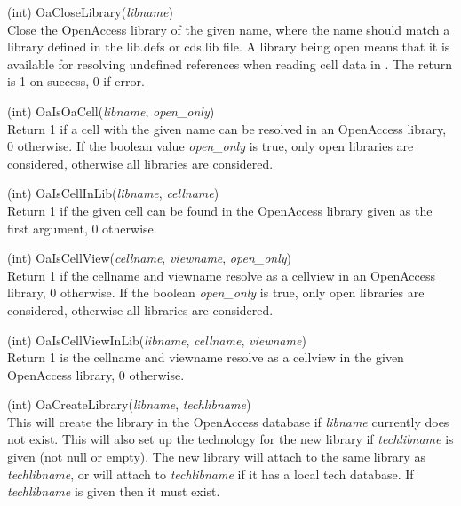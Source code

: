\begin{description}
\item{(int) \vt OaCloseLibrary({\it libname\/})}\\
Close the OpenAccess library of the given name, where the name should
match a library defined in the {\vt lib.defs} or {\vt cds.lib} file. 
A library being open means that it is available for resolving
undefined references when reading cell data in {\Xic}.  The return is
1 on success, 0 if error.

\item{(int) \vt OaIsOaCell({\it libname\/}, {\it open\_only\/})}\\
Return 1 if a cell with the given name can be resolved in an
OpenAccess library, 0 otherwise.  If the boolean value {\it
open\_only} is true, only open libraries are considered, otherwise all
libraries are considered.

\item{(int) \vt OaIsCellInLib({\it libname\/}, {\it cellname\/})}\\
Return 1 if the given cell can be found in the OpenAccess library
given as the first argument, 0 otherwise.

\item{(int) \vt OaIsCellView({\it cellname\/}, {\it viewname\/},
  {\it open\_only\/})}\\
Return 1 if the cellname and viewname resolve as a cellview in an
OpenAccess library, 0 otherwise.  If the boolean {\it open\_only} is
true, only open libraries are considered, otherwise all libraries are
considered.

\item{(int) \vt OaIsCellViewInLib({\it libname\/}, {\it cellname\/},
  {\it viewname\/})}\\
Return 1 is the cellname and viewname resolve as a cellview in the
given OpenAccess library, 0 otherwise.

\item{(int) \vt OaCreateLibrary({\it libname\/}, {\it techlibname\/})}\\
This will create the library in the OpenAccess database if {\it
libname} currently does not exist.  This will also set up the
technology for the new library if {\it techlibname} is given (not null
or empty).  The new library will attach to the same library as {\it
techlibname}, or will attach to {\it techlibname} if it has a local
tech database.  If {\it techlibname} is given then it must exist. 


\end{description}
